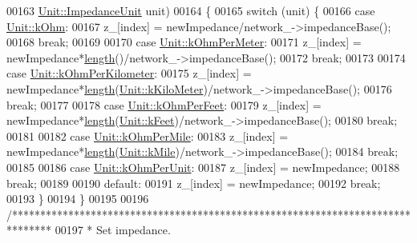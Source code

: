 \begin{DoxyCode}
00163                 \hyperlink{class_unit_a3747e779c805df24a71961290be3fbdf}{Unit::ImpedanceUnit} unit)
00164 \{
00165   \textcolor{keywordflow}{switch} (unit) \{
00166   \textcolor{keywordflow}{case} \hyperlink{class_unit_a3747e779c805df24a71961290be3fbdfa6b9c74d1763eefbaf751eeecff0bd9da}{Unit::kOhm}:
00167     z\_[index] = newImpedance/network\_->impedanceBase();
00168     \textcolor{keywordflow}{break};
00169 
00170   \textcolor{keywordflow}{case} \hyperlink{class_unit_a3747e779c805df24a71961290be3fbdfa35e9ca44deb5a35fdb576111cf0db336}{Unit::kOhmPerMeter}:
00171     z\_[index] = newImpedance*\hyperlink{group___models_gae2e4500d0fa60dcc2ecb08b2c96954f9}{length}()/network\_->impedanceBase();
00172     \textcolor{keywordflow}{break};
00173 
00174   \textcolor{keywordflow}{case} \hyperlink{class_unit_a3747e779c805df24a71961290be3fbdfa56a0289d2ddeff7ca4aa8ba410df79d6}{Unit::kOhmPerKilometer}:
00175     z\_[index] = newImpedance*\hyperlink{group___models_gae2e4500d0fa60dcc2ecb08b2c96954f9}{length}(\hyperlink{class_unit_a8c8921f7b225ad6063b1cb573425b9a0a1c04f3dd196dbe1832a2658215b0d919}{Unit::kKiloMeter})/network\_->impedanceBase();
00176     \textcolor{keywordflow}{break};
00177 
00178   \textcolor{keywordflow}{case} \hyperlink{class_unit_a3747e779c805df24a71961290be3fbdfa433b57934ca3be960ec7a60f3ea6ea87}{Unit::kOhmPerFeet}:
00179     z\_[index] = newImpedance*\hyperlink{group___models_gae2e4500d0fa60dcc2ecb08b2c96954f9}{length}(\hyperlink{class_unit_a8c8921f7b225ad6063b1cb573425b9a0a9ac9b167b0ebce477fb53d6ace04ddc8}{Unit::kFeet})/network\_->impedanceBase();
00180     \textcolor{keywordflow}{break};
00181 
00182   \textcolor{keywordflow}{case} \hyperlink{class_unit_a3747e779c805df24a71961290be3fbdfa1d5bb04c9ecda66b09891af21cd4f613}{Unit::kOhmPerMile}:
00183     z\_[index] = newImpedance*\hyperlink{group___models_gae2e4500d0fa60dcc2ecb08b2c96954f9}{length}(\hyperlink{class_unit_a8c8921f7b225ad6063b1cb573425b9a0a2ebde742068bbee0510de32fbb4cd724}{Unit::kMile})/network\_->impedanceBase();
00184     \textcolor{keywordflow}{break};
00185 
00186   \textcolor{keywordflow}{case} \hyperlink{class_unit_a3747e779c805df24a71961290be3fbdfa9327dc8628a47375d70037499f9d0910}{Unit::kOhmPerUnit}:
00187     z\_[index] = newImpedance;
00188     \textcolor{keywordflow}{break};
00189 
00190   \textcolor{keywordflow}{default}:
00191     z\_[index] = newImpedance;
00192     \textcolor{keywordflow}{break};
00193   \}
00194 \}
00195 
00196 \textcolor{comment}{/*******************************************************************************}
00197 \textcolor{comment}{ * Set impedance.}

\end{DoxyCode}
